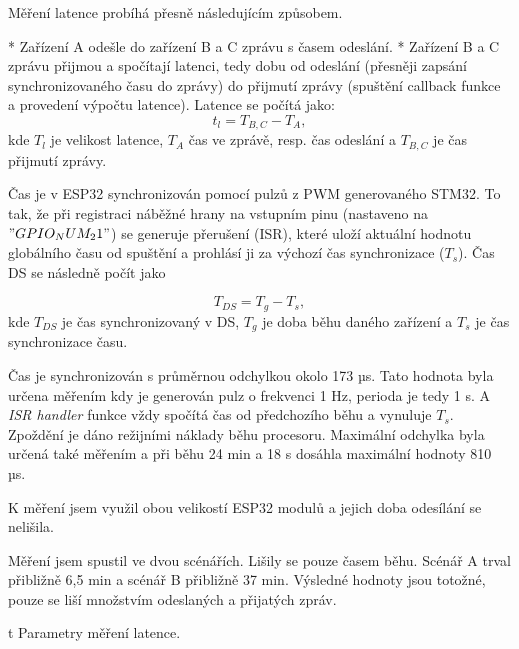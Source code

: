 Měření latence probíhá přesně následujícím způsobem.

\begitems
* Zařízení A odešle do zařízení B a C zprávu s časem odeslání.
* Zařízení B a C zprávu přijmou a spočítají latenci, tedy dobu od odeslání (přesněji zapsání synchronizovaného času do zprávy) do přijmutí zprávy (spuštění callback funkce a provedení výpočtu latence). Latence se počítá jako:
$$
t_l = T_{B,C} - T_A,
$$
kde $T_l$ je velikost latence, $T_A$ čas ve zprávě, resp. čas odeslání a $T_{B,C}$ je čas přijmutí zprávy.
\enditems

Čas je v ESP32 synchronizován pomocí pulzů z PWM generovaného STM32. To tak, že při registraci náběžné hrany na vstupním pinu (nastaveno na $"GPIO_NUM_21"$) se generuje přerušení (ISR), které uloží aktuální hodnotu globálního času od spuštění a prohlásí ji za výchozí čas synchronizace ($T_s$). Čas DS se následně počít jako

$$
T_{DS} = T_g - T_s,
$$
kde $T_{DS}$ je čas synchronizovaný v DS, $T_g$ je doba běhu daného zařízení a $T_s$ je čas synchronizace času.

Čas je synchronizován s průměrnou odchylkou okolo 173 µs. Tato hodnota byla určena měřením kdy je generován pulz o frekvenci 1 Hz, perioda je tedy 1 s. A {\em ISR handler} funkce vždy spočítá čas od předchozího běhu a vynuluje $T_s$. Zpoždění je dáno režijními náklady běhu procesoru. Maximální odchylka byla určená také měřením a při běhu 24 min a 18 s dosáhla maximální hodnoty 810 µs.

K měření jsem využil obou velikostí ESP32 modulů a jejich doba odesílání se nelišila.

Měření jsem spustil ve dvou scénářích. Lišily se pouze časem běhu. Scénář A trval přibližně 6,5 min a scénář B přibližně 37 min. Výsledné hodnoty jsou totožné, pouze se liší množstvím odeslaných a přijatých zpráv.

\midinsert {}
\caption/t Parametry měření latence.
\endinsert

